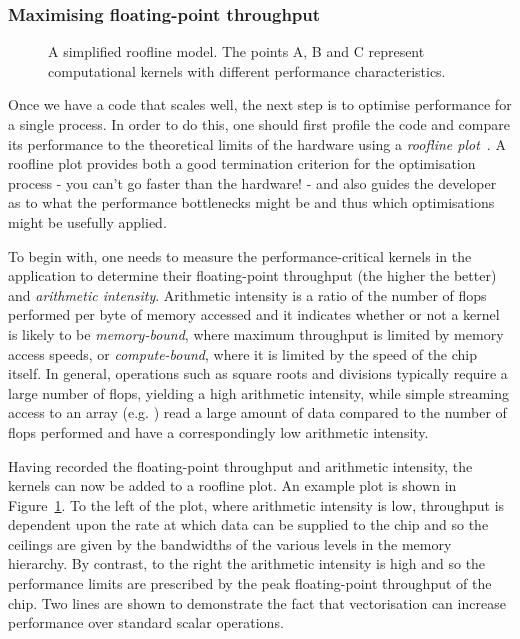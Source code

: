 \subsubsection{Maximising floating-point throughput}
\label{sec:background_perf_flops}

\begin{figure}
  
  \caption{
    A simplified roofline model.
    The points A, B and C represent computational kernels with different performance characteristics.
  }
  \label{fig:roofline}
\end{figure}


Once we have a code that scales well, the next step is to optimise performance for a single process.
In order to do this, one should first profile the code and compare its performance to the theoretical limits of the hardware using a \textit{roofline plot}~\cite{williamsRooflineInsightfulVisual2009}.
A roofline plot provides both a good termination criterion for the optimisation process - you can't go faster than the hardware! - and also guides the developer as to what the performance bottlenecks might be and thus which optimisations might be usefully applied.

To begin with, one needs to measure the performance-critical kernels in the application to determine their floating-point throughput (the higher the better) and \textit{arithmetic intensity}.
Arithmetic intensity is a ratio of the number of \glspl{flop} performed per byte of memory accessed and it indicates whether or not a kernel is likely to be \textit{memory-bound}, where maximum throughput is limited by memory access speeds, or \textit{compute-bound}, where it is limited by the speed of the chip itself.
In general, operations such as square roots and divisions typically require a large number of \glspl{flop}, yielding a high arithmetic intensity, while simple streaming access to an array (e.g. ) read a large amount of data compared to the number of \glspl{flop} performed and have a correspondingly low arithmetic intensity.

Having recorded the floating-point throughput and arithmetic intensity, the kernels can now be added to a roofline plot.
An example plot is shown in Figure~\ref{fig:roofline}.
To the left of the plot, where arithmetic intensity is low, throughput is dependent upon the rate at which data can be supplied to the chip and so the ceilings are given by the bandwidths of the various levels in the memory hierarchy.
By contrast, to the right the arithmetic intensity is high and so the performance limits are prescribed by the peak floating-point throughput of the chip.
Two lines are shown to demonstrate the fact that vectorisation can increase performance over standard scalar operations.

